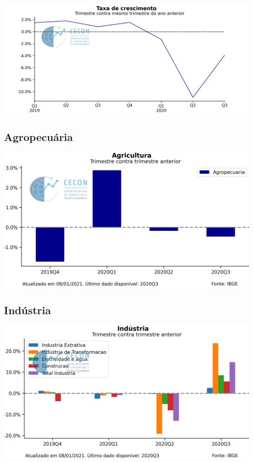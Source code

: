 \documentclass{SelfArx}
\begin{document}
\begin{center}
\includegraphics[width=.9\linewidth]{./figs/PIB/PIB_YoY.png}
\end{center}

\subsection*{Agropecuária}
\label{sec:orgdc169c4}

\begin{center}
\includegraphics[width=.9\linewidth]{./figs/PIB/Agropecuaria.png}
\end{center}

\subsection*{Indústria}
\label{sec:orgda5d91f}

\begin{center}
\includegraphics[width=.9\linewidth]{./figs/PIB/Industria.png}
\end{center}
\end{document}
